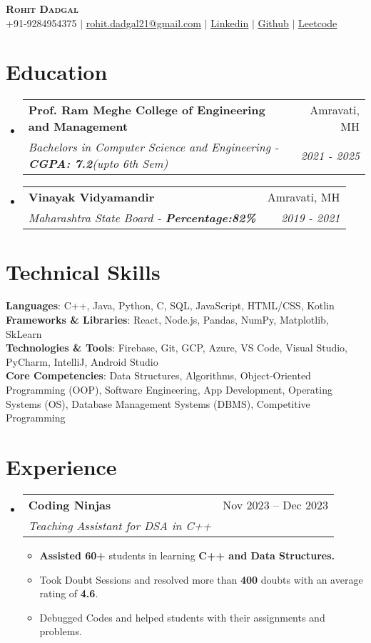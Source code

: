 \documentclass[letterpaper,1pt]{article}
\makeatletter
\newcommand{\resumeItem}[1]{
  \item\small{
    {#1 \vspace{-2pt}}
  }
}
\newcommand{\resumeSubheading}[4]{
  \vspace{-2pt}\item
    \begin{tabular*}{0.97\textwidth}[t]{l@{\extracolsep{\fill}}r}
      \textbf{#1} & #2 \\
      \textit{\small#3} & \textit{\small #4} \\
    \end{tabular*}\vspace{-7pt}
}
\newcommand{\resumeSubHeadingListStart}{\begin{itemize}[leftmargin=0.15in, label={}]}
\newcommand{\resumeSubHeadingListEnd}{\end{itemize}}
\newcommand{\resumeItemListStart}{\begin{itemize}}
\newcommand{\resumeItemListEnd}{\end{itemize}\vspace{-5pt}}
\makeatother
\begin{document}
\begin{center}
    \textbf{\Huge \scshape Rohit Dadgal} \\ \vspace{1pt}
    \small +91-9284954375  $|$ \href{mailto:rohit.dadgal21@gmail.com}{\underline{rohit.dadgal21@gmail.com}} $|$ 
    \href{https://www.linkedin.com/in/rohitdadgal/}{\underline{Linkedin}} $|$
    \href{https://github.com/rohitd2103}{\underline{Github}} $|$
    \href{https://leetcode.com/u/Rohit2103/}{\underline{Leetcode}}
\end{center}

\section{Education}
  \resumeSubHeadingListStart
    \resumeSubheading
      {Prof. Ram Meghe College of Engineering and Management}{Amravati, MH}
      {Bachelors in Computer Science and Engineering - \textbf{CGPA: 7.2}(upto 6th Sem)}{2021 - 2025}
    \resumeSubheading
      {Vinayak Vidyamandir}{Amravati, MH}
      {Maharashtra State Board - \textbf{Percentage:82\%} }{ 2019 - 2021}
  \resumeSubHeadingListEnd

\section{Technical Skills}
 \begin{itemize}[leftmargin=0.15in, label={}]
    \small{\item{
     \textbf{Languages}{: C++, Java, Python, C, SQL, JavaScript, HTML/CSS, Kotlin } \\
     \textbf{Frameworks \& Libraries}{: React, Node.js, Pandas, NumPy, Matplotlib, SkLearn  } \\
     \textbf{Technologies \& Tools}{: Firebase, Git, GCP, Azure, VS Code, Visual Studio, PyCharm, IntelliJ, Android Studio} \\
     \textbf{Core Competencies}{: Data Structures, Algorithms, Object-Oriented Programming (OOP), Software Engineering, App Development, Operating Systems (OS), Database Management Systems (DBMS), Competitive Programming}
    }}
 \end{itemize}

\section{Experience}
  \resumeSubHeadingListStart
    \resumeSubheading
      {Coding Ninjas}{Nov 2023 -- Dec 2023}
      {Teaching Assistant for DSA in C++}{}
      \resumeItemListStart
        \resumeItem{\textbf{Assisted 60+} students in learning \textbf{C++ and Data Structures.}}
        \resumeItem{Took Doubt Sessions and resolved more than \textbf{400} doubts with an average rating of \textbf{4.6}.}
        \resumeItem{Debugged Codes and helped students with their assignments and problems.}
      \resumeItemListEnd
  \resumeSubHeadingListEnd
\end{document}
